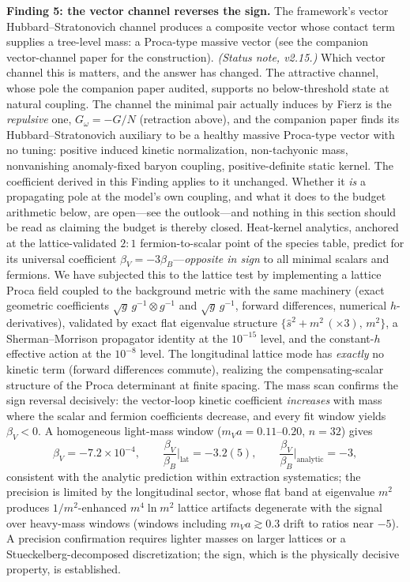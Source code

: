 \documentclass[11pt,a4paper]{article}
\begin{document}
\textbf{Finding 5: the vector channel reverses the sign.}
The framework's vector Hubbard--Stratonovich channel produces a
composite vector whose contact term supplies a tree-level mass: a
Proca-type massive vector (see the companion vector-channel paper
for the construction).
\emph{(Status note, v2.15.)}  Which vector channel this is
matters, and the answer has changed.  The attractive channel,
whose pole the companion paper audited, supports no
below-threshold state at natural coupling.  The channel the
minimal pair actually induces by Fierz is the \emph{repulsive}
one, $G_\omega = -G/N$ (retraction above), and the companion
paper finds its Hubbard--Stratonovich auxiliary to be a healthy
massive Proca-type vector with no tuning: positive induced
kinetic normalization, non-tachyonic mass, nonvanishing
anomaly-fixed baryon coupling, positive-definite static kernel.
The coefficient derived in this Finding applies to it unchanged.
Whether it \emph{is} a propagating pole at the model's own
coupling, and what it does to the budget arithmetic below, are
open---see the outlook---and nothing in this section should be
read as claiming the budget is thereby closed.
Heat-kernel analytics, anchored at the lattice-validated $2{:}1$
fermion-to-scalar point of the species table, predict for its
universal coefficient
$\beta_V = -3\beta_B$---\emph{opposite in sign} to all minimal
scalars and fermions.
We have subjected this to the lattice test by implementing a
lattice Proca field coupled to the background metric with the same
machinery (exact geometric coefficients
$\sqrt{g}\,g^{-1}\!\otimes g^{-1}$ and $\sqrt{g}\,g^{-1}$, forward
differences, numerical $h$-derivatives), validated by exact flat
eigenvalue structure $\{\hat s^2 + m^2\,(\times 3),\, m^2\}$, a
Sherman--Morrison propagator identity at the $10^{-15}$ level, and
the constant-$h$ effective action at the $10^{-8}$ level.
The longitudinal lattice mode has \emph{exactly} no kinetic term
(forward differences commute), realizing the compensating-scalar
structure of the Proca determinant at finite spacing.
The mass scan confirms the sign reversal decisively: the
vector-loop kinetic coefficient \emph{increases} with mass where
the scalar and fermion coefficients decrease, and every fit window
yields $\beta_V < 0$.
A homogeneous light-mass window ($m_V a = 0.11$--$0.20$, $n=32$)
gives
\begin{equation}
\beta_V = -7.2\times 10^{-4},
\qquad
\frac{\beta_V}{\beta_B}\Big|_{\mathrm{lat}} = -3.2(5),
\qquad
\frac{\beta_V}{\beta_B}\Big|_{\mathrm{analytic}} = -3,
\label{eq:betaVlat}
\end{equation}
consistent with the analytic prediction within extraction
systematics; the precision is limited by the longitudinal sector,
whose flat band at eigenvalue $m^2$ produces $1/m^2$-enhanced
$m^4\ln m^2$ lattice artifacts degenerate with the signal over
heavy-mass windows (windows including $m_V a \gtrsim 0.3$ drift to
ratios near $-5$).
A precision confirmation requires lighter masses on larger
lattices or a Stueckelberg-decomposed discretization; the sign,
which is the physically decisive property, is established.
\end{document}
